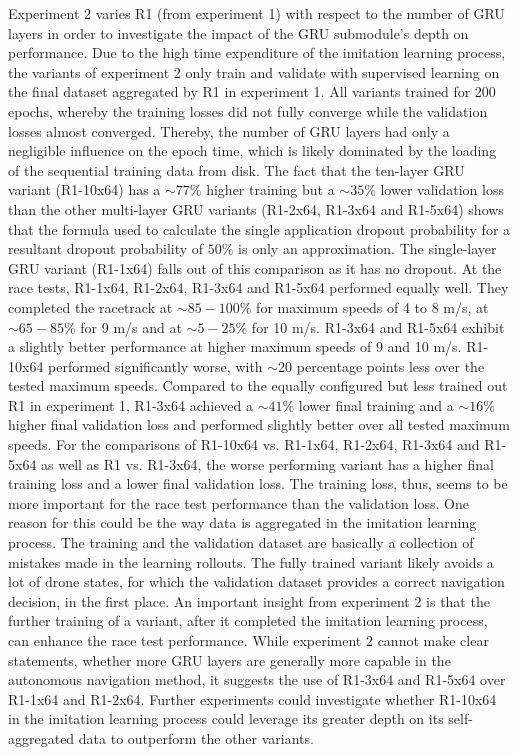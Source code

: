 Experiment 2 varies R1 (from experiment 1)
with respect to the number of GRU layers 
in order to investigate
the impact of the GRU submodule's depth on performance.
Due to the high time expenditure of the imitation learning process,
the variants of experiment 2 
only train and validate with supervised learning 
on the final dataset aggregated by R1 in experiment 1.
All variants trained for 200 epochs,
whereby the training losses did not fully converge
while the validation losses almost converged.
Thereby, the number of GRU layers had only a negligible influence on the epoch time,
which is likely dominated by the loading of the sequential training data from disk.
The fact that the ten-layer GRU variant (R1-10x64)
has a $\sim 77 \%$ higher training
but a $\sim 35 \%$ lower validation loss 
than the other multi-layer GRU variants (R1-2x64, R1-3x64 and R1-5x64)
shows that the formula used to calculate the single application dropout probability
for a resultant dropout probability of $50 \%$ is only an approximation.
The single-layer GRU variant (R1-1x64) falls out of this comparison as it has no dropout.
At the race tests, R1-1x64, R1-2x64, R1-3x64 and R1-5x64 performed equally well.
They completed the racetrack at $\sim 85 - 100 \%$ for maximum speeds of 4 to 8 m/s,
at $\sim 65 - 85 \%$ for 9 m/s 
and at $\sim 5 - 25 \%$ for 10 m/s.
R1-3x64 and R1-5x64 exhibit a slightly better performance at higher maximum speeds of 9 and 10 m/s.
R1-10x64 performed significantly worse, 
with $\sim 20$ percentage points less over the tested maximum speeds.
Compared to the equally configured but less trained out R1 in experiment 1,
R1-3x64 achieved a $\sim 41 \%$ lower final training
and a $\sim 16 \%$ higher final validation loss
and performed slightly better over all tested maximum speeds.
For the comparisons of R1-10x64 vs. R1-1x64, R1-2x64, R1-3x64 and R1-5x64
as well as R1 vs. R1-3x64,
the worse performing variant has a higher final training loss and a lower final validation loss.
The training loss, thus, seems to be more important for the race test performance than the validation loss.
One reason for this could be the way data is aggregated in the imitation learning process.
The training and the validation dataset are basically a collection of mistakes made in the learning rollouts.
The fully trained variant likely avoids a lot of drone states, 
for which the validation dataset provides a correct navigation decision,
in the first place.
An important insight from experiment 2 is that 
the further training of a variant, after it completed the imitation learning process,
can enhance the race test performance.
While experiment 2 cannot make clear statements,
whether more GRU layers are generally more capable in the autonomous navigation method,
it suggests the use of R1-3x64 and R1-5x64 over R1-1x64 and R1-2x64.
Further experiments could investigate
whether R1-10x64 in the imitation learning process
could leverage its greater depth on its self-aggregated data
to outperform the other variants.



